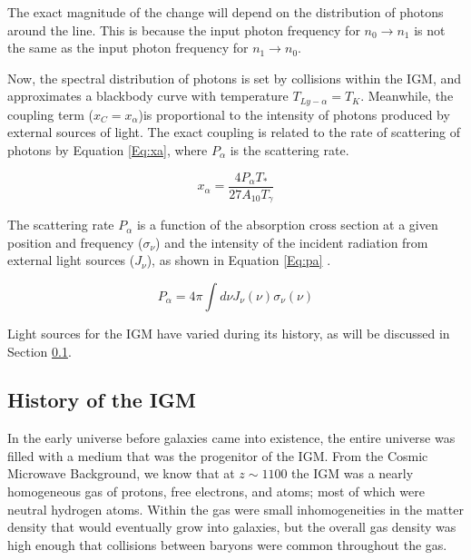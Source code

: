 The exact magnitude of the change will depend on the distribution of photons around the \lya  line. This is because the input photon frequency for $n_0 \rightarrow n_1$ is not the same as the input photon frequency for $n_1 \rightarrow n_0$.

Now, the spectral distribution of \lya  photons is set by collisions within the IGM, and approximates a blackbody curve with temperature $T_{Ly-\alpha} = T_K$. Meanwhile, the \lya  coupling term ($x_C = x_{\alpha}$)is proportional to the intensity of \lya  photons produced by external sources of light. The exact \lya  coupling is related to the rate of scattering of \lya  photons by Equation \ref{Eq:xa}, where $P_{\alpha}$ is the scattering rate. 

\begin{equation}\label{Eq:xa}
x_{\alpha} = \frac{4 P_{\alpha} T_*}{27 A_{10} T_{\gamma}}
\end{equation}

The scattering rate $P_{\alpha}$ is a function of the absorption cross section at a given position and frequency ($\sigma_{\nu}$) and the intensity of the incident radiation from external light sources ($J_{\nu}$), as shown in Equation \ref{Eq:pa} \cite{furlanetto_2006}. 

\begin{equation}\label{Eq:pa}
P_{\alpha} = 4 \pi \int d\nu J_{\nu}(\nu) \sigma_{\nu}(\nu)
\end{equation}

Light sources for the IGM have varied during its history, as will be discussed in Section \ref{Sec:IGMhist}.

\subsection{History of the IGM} \label{Sec:IGMhist}
In the early universe before galaxies came into existence, the entire universe was filled with a medium that was the progenitor of the IGM. From the Cosmic Microwave Background, we know that at $z \sim 1100$ the IGM was a nearly homogeneous gas of protons, free electrons, and atoms; most of which were neutral hydrogen atoms. Within the gas were small inhomogeneities in the matter density that would eventually grow into galaxies, but the overall gas density was high enough that collisions between baryons were common throughout the gas. 

